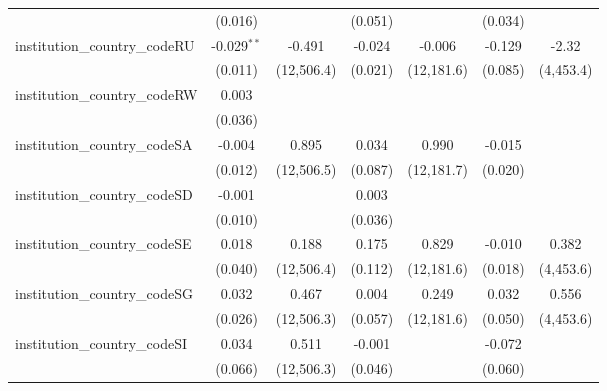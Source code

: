 \begin{tabular}{lcccccc}
                                         & (0.016)        &               & (0.051)       &               & (0.034)       &   \\   
   institution\_country\_codeRU          & -0.029$^{**}$  & -0.491        & -0.024        & -0.006        & -0.129        & -2.32\\   
                                         & (0.011)        & (12,506.4)    & (0.021)       & (12,181.6)    & (0.085)       & (4,453.4)\\   
   institution\_country\_codeRW          & 0.003          &               &               &               &               &   \\   
                                         & (0.036)        &               &               &               &               &   \\   
   institution\_country\_codeSA          & -0.004         & 0.895         & 0.034         & 0.990         & -0.015        &   \\   
                                         & (0.012)        & (12,506.5)    & (0.087)       & (12,181.7)    & (0.020)       &   \\   
   institution\_country\_codeSD          & -0.001         &               & 0.003         &               &               &   \\   
                                         & (0.010)        &               & (0.036)       &               &               &   \\   
   institution\_country\_codeSE          & 0.018          & 0.188         & 0.175         & 0.829         & -0.010        & 0.382\\   
                                         & (0.040)        & (12,506.4)    & (0.112)       & (12,181.6)    & (0.018)       & (4,453.6)\\   
   institution\_country\_codeSG          & 0.032          & 0.467         & 0.004         & 0.249         & 0.032         & 0.556\\   
                                         & (0.026)        & (12,506.3)    & (0.057)       & (12,181.6)    & (0.050)       & (4,453.6)\\   
   institution\_country\_codeSI          & 0.034          & 0.511         & -0.001        &               & -0.072        &   \\   
                                         & (0.066)        & (12,506.3)    & (0.046)       &               & (0.060)       &   \\   

\end{tabular}
